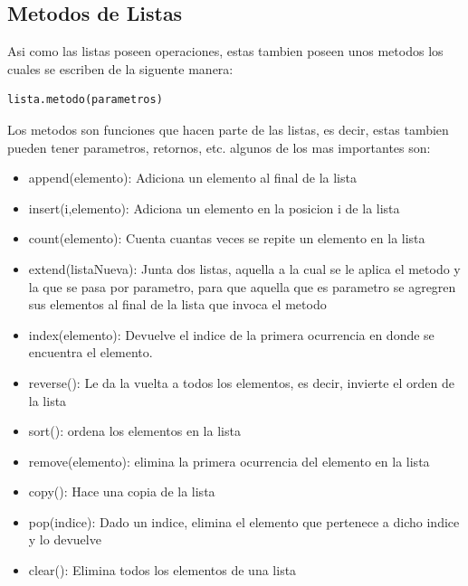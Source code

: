 \documentclass{article}
\begin{document}
\subsection{Metodos de Listas}
Asi como las listas poseen operaciones, estas tambien poseen unos metodos los cuales se escriben de la siguente manera:
\begin{lstlisting}[language=Python, caption= Metodos de Listas]
lista.metodo(parametros)
\end{lstlisting}
Los metodos son funciones que hacen parte de las listas, es decir, estas tambien pueden tener parametros, retornos, etc. algunos de los mas importantes son:
\begin{itemize}
    \item append(elemento): Adiciona un elemento al final de la lista
    \item insert(i,elemento): Adiciona un elemento en la posicion i de la lista
    \item count(elemento): Cuenta cuantas veces se repite un elemento en la lista
    \item extend(listaNueva): Junta dos listas, aquella a la cual se le aplica el metodo y la que se pasa por parametro, para que aquella que es parametro se agregren sus elementos al final de la lista que invoca el metodo
    \item index(elemento): Devuelve el indice de la primera ocurrencia en donde se encuentra el elemento.
    \item reverse(): Le da la vuelta a todos los elementos, es decir, invierte el orden de la lista
    \item sort(): ordena los elementos en la lista
    \item remove(elemento): elimina la primera ocurrencia del elemento en la lista
    \item copy(): Hace una copia de la lista
    \item pop(indice): Dado un indice, elimina el elemento que pertenece a dicho indice y lo devuelve
    \item clear(): Elimina todos los elementos de una lista
\end{itemize}
\end{document}
